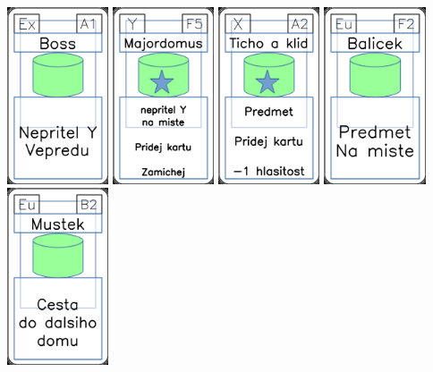 \documentclass[a4paper]{article}
\begin{document}
	\includegraphics[width=3.0cm]{img-4_0}
	\includegraphics[width=3.0cm]{img-5_29}
	\includegraphics[width=3.0cm]{img-5_1}
	\includegraphics[width=3.0cm]{img-4_26}
	\includegraphics[width=3.0cm]{img-4_36}
\end{document}
